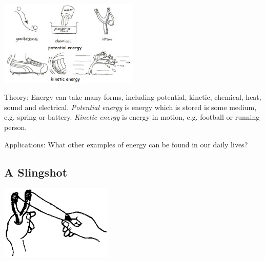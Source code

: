 \begin{multicols}{2}
\begin{center}
\includegraphics[width=0.5\textwidth]{./img/vso/forms-energy.jpg}
\end{center}

\begin{description*}
\item[Theory:]{Energy can take many forms, including potential, kinetic, chemical, heat, sound and electrical. \emph{Potential energy} is energy which is stored is some medium, e.g. spring or battery. \emph{Kinetic energy} is energy in motion, e.g. football or running person.}
\item[Applications:]{What other examples of energy can be found in our daily lives?}
\end{description*}

\subsection{A Slingshot}

\begin{center}
\includegraphics[width=0.4\textwidth]{./img/source/slingshot.png}
\end{center}


\end{multicols}
